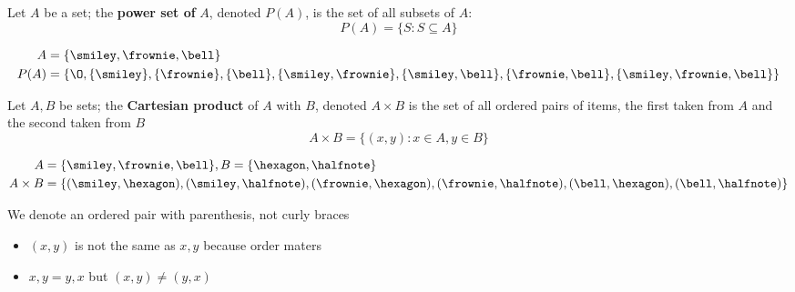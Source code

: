 \begin{definition}\label{def:power-set}
    Let $A$ be a set; the \textbf{power set of} $A$, denoted $P(A)$, is the set of all subsets of $A$:
    \[
    P(A)=\{S:S \subseteq A\} 
    \]
\end{definition} 
\begin{eg}
    \begin{align*}
    A&=\{\smiley,\frownie,\bell\} \\
    P(A)&=\{\O,\{\smiley\},\{\frownie\},\{\bell\},\{\smiley,\frownie\},\{\smiley,\bell\},\{\frownie,\bell\},\{\smiley,\frownie,\bell\}\}
    \end{align*}
\end{eg}    
\begin{definition}\label{def:cartesian-product}
    Let $A,B$ be sets; the \textbf{Cartesian product} of $A$ with $B$, denoted $A \times B$ is the set of all ordered pairs of items, the first taken from $A$ and the second taken from $B$
    \[
    A \times B = \{(x,y):x \in A, y \in B\}
    \]
\end{definition}
\begin{eg}
    \begin{align*}
    A&=\{\smiley,\frownie,\bell\},B=\{\hexagon,\halfnote\} \\
    A \times B &= \{(\smiley,\hexagon),(\smiley,\halfnote),(\frownie,\hexagon),(\frownie,\halfnote),(\bell,\hexagon),(\bell,\halfnote)\}
    \end{align*}
\end{eg}
\begin{note}
    We denote an ordered pair with parenthesis, not curly braces
    \begin{itemize}
        \item $(x,y)$ is not the same as ${x,y}$ because order maters
        \item ${x,y}={y,x}$ but $(x,y)\neq(y,x)$
    \end{itemize}
\end{note}


